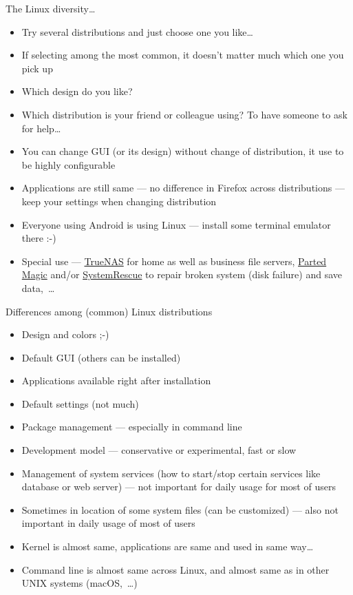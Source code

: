 \documentclass[compress, xelatex, 11pt, xcolor=svgnames, aspectratio=169,
	hyperref={
		bookmarks=true,
		unicode=true,
		colorlinks=true,
		pdftitle={Linux, command line and MetaCentrum},
		plainpages=false,
		pdfauthor={Vojtech Zeisek},
		pdfsubject={Course about use of Linux command line, writing shell scripts and using MetaCentrum of CESNET},
		pdfcreator={XeLaTeX},
		pdfkeywords={Linux, GNU, BASH, shell, command line, MetaCentrum},
		linkcolor=DarkRed, %
		anchorcolor=DarkBlue, %
		citecolor=Indigo, %
		filecolor=NavyBlue, %
		menucolor=DarkMagenta, %
		urlcolor=DarkBlue, %
		},
	url={hyphens, lowtilde} %
	]{beamer}
\begin{document}
\begin{frame}{The Linux diversity\ldots}
	\begin{itemize}
		\item Try several distributions and just choose one you like\ldots
		\item If selecting among the most common, it doesn't matter much which one you pick up
		\item Which design do you like?
		\item Which distribution is your friend or colleague using? To have someone to ask for help\ldots
		\item You can change GUI (or its design) without change of distribution, it use to be highly configurable
		\item Applications are still same --- no difference in Firefox across distributions --- keep your settings when changing distribution
		\item Everyone using Android is using Linux --- install some terminal emulator there :-)
		\item Special use --- \href{https://www.truenas.com/}{TrueNAS} for home as well as business file servers, \href{https://partedmagic.com/}{Parted Magic} and/or \href{https://www.system-rescue.org/}{SystemRescue} to repair broken system (disk failure) and save data,~\ldots
	\end{itemize}
\end{frame}

\begin{frame}{Differences among (common) Linux distributions}
	\begin{itemize}
		\item Design and colors ;-)
		\item Default GUI (others can be installed)
		\item Applications available right after installation
		\item Default settings (not much)
		\item Package management --- especially in command line
		\item Development model --- conservative or experimental, fast or slow
		\item Management of system services (how to start/stop certain services like database or web server) --- not important for daily usage for most of users
		\item Sometimes in location of some system files (can be customized) --- also not important in daily usage of most of users
		\item Kernel is almost same, applications are same and used in same way\ldots
		\item Command line is almost same across Linux, and almost same as in other UNIX systems (macOS,~\ldots)
	\end{itemize}
\end{frame}
\end{document}
